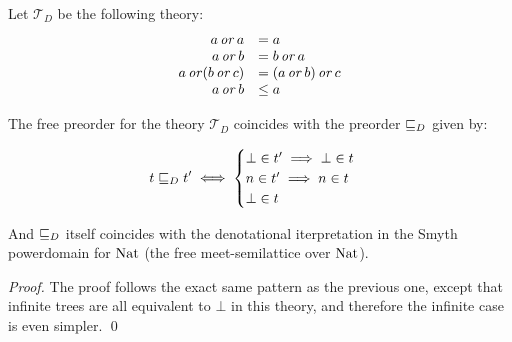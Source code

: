 \begin{lemma}
    \label{lem:demopreo}
    Let $\mathcal{T}_D$ be the following theory:
    \begin{equation*}
        \begin{array}{rl}
            a \operatorname{\mathit{or}} a &= a \\
            a \operatorname{\mathit{or}} b &= b \operatorname{\mathit{or}} a \\
            a \operatorname{\mathit{or}} (b \operatorname{\mathit{or}} c) &= (a \operatorname{\mathit{or}} b) \operatorname{\mathit{or}} c \\
            a \operatorname{\mathit{or}} b &\leq a
        \end{array}
    \end{equation*}

    The free preorder for the theory $\mathcal{T}_D$ coincides with 
    the preorder $\sqsubseteq_D$ given by:

    \begin{equation*}
        t \sqsubseteq_D t' \iff 
        \begin{cases}
            \bot \in t' \implies \bot \in t \\
            n    \in t' \implies n \in t    \\
            \bot \in t
        \end{cases}
    \end{equation*}

    And $\sqsubseteq_D$ itself coincides with the denotational
    iterpretation in the Smyth powerdomain for $\textnormal{Nat}$
    (the free meet-semilattice over $\textnormal{Nat}$).
\end{lemma}

\begin{proof}
    The proof follows the exact same pattern as the previous one,
    except that infinite trees are all equivalent to $\bot$ 
    in this theory, and therefore the infinite case is even 
    simpler.
\qed\end{proof}


